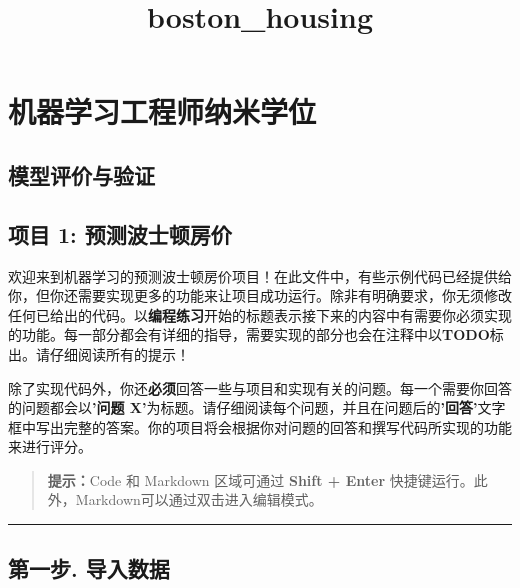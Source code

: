 \documentclass[11pt]{article}
\title{boston\_housing}
\begin{document}
    
    
    \maketitle
    
    

    
    \section{机器学习工程师纳米学位}\label{ux673aux5668ux5b66ux4e60ux5de5ux7a0bux5e08ux7eb3ux7c73ux5b66ux4f4d}

\subsection{模型评价与验证}\label{ux6a21ux578bux8bc4ux4ef7ux4e0eux9a8cux8bc1}

\subsection{项目 1:
预测波士顿房价}\label{ux9879ux76ee-1-ux9884ux6d4bux6ce2ux58ebux987fux623fux4ef7}

欢迎来到机器学习的预测波士顿房价项目！在此文件中，有些示例代码已经提供给你，但你还需要实现更多的功能来让项目成功运行。除非有明确要求，你无须修改任何已给出的代码。以\textbf{编程练习}开始的标题表示接下来的内容中有需要你必须实现的功能。每一部分都会有详细的指导，需要实现的部分也会在注释中以\textbf{TODO}标出。请仔细阅读所有的提示！

除了实现代码外，你还\textbf{必须}回答一些与项目和实现有关的问题。每一个需要你回答的问题都会以\textbf{'问题
X'}为标题。请仔细阅读每个问题，并且在问题后的\textbf{'回答'}文字框中写出完整的答案。你的项目将会根据你对问题的回答和撰写代码所实现的功能来进行评分。

\begin{quote}
\textbf{提示：}Code 和 Markdown 区域可通过 \textbf{Shift + Enter}
快捷键运行。此外，Markdown可以通过双击进入编辑模式。
\end{quote}

    \begin{center}\rule{0.5\linewidth}{\linethickness}\end{center}

\subsection{第一步.
导入数据}\label{ux7b2cux4e00ux6b65.-ux5bfcux5165ux6570ux636e}
\end{document}
